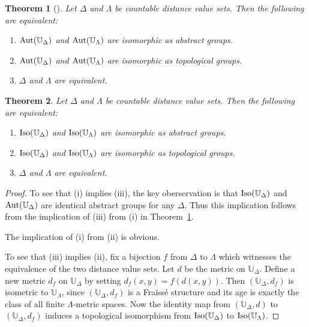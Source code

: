 \documentclass[10pt,a4paper]{amsart}
\newtheorem{theorem}{Theorem}[section]
\theoremstyle{definition}
\theoremstyle{remark}
\begin{document}
 \begin{theorem}[\cite{EGLMM}]\label{thm:char}
        Let $\Delta$ and $\Lambda$ be countable distance value sets. Then the following are equivalent: 
        \begin{enumerate}
            \item[\rm (i)] ${\rm Aut}(\mathbb{U}_\Delta)$ and ${\rm Aut}(\mathbb{U}_\Lambda)$ are isomorphic as abstract groups.  
            \item[\rm (ii)] ${\rm Aut}(\mathbb{U}_\Delta)$ and ${\rm Aut}(\mathbb{U}_\Lambda)$ are isomorphic as topological groups. 
            \item[\rm (iii)] $\Delta$ and $\Lambda$ are equivalent. 
        \end{enumerate}
    \end{theorem}

 \begin{theorem}\label{thm:remain2}
        Let $\Delta$ and $\Lambda$ be countable distance value sets. Then the following are equivalent: 
        \begin{enumerate}
            \item[\rm (i)] ${\rm Iso}(\mathbb{U}_\Delta)$ and ${\rm Iso}(\mathbb{U}_\Lambda)$ are isomorphic as abstract groups.  
            \item[\rm (ii)] ${\rm Iso}(\mathbb{U}_\Delta)$ and ${\rm Iso}(\mathbb{U}_\Lambda)$ are isomorphic as topological groups. 
            \item[\rm (iii)] $\Delta$ and $\Lambda$ are equivalent. 
        \end{enumerate}
    \end{theorem}

\begin{proof} To see that (i) implies (iii), the key oberservation is that $\mbox{\rm Iso}(\mathbb{U}_\Delta)$ and $\mbox{\rm Aut}(\mathbb{U}_\Delta)$ are identical abstract groups for any $\Delta$. Thus this implication follows from the implication of (iii) from (i) in Theorem~\ref{thm:char}. 

The implication of (i) from (ii) is obvious. 

To see that (iii) implies (ii), fix a bijection $f$ from $\Delta$ to $\Lambda$ which witnesses the equivalence of the two distance value sets. Let $d$ be the metric on $\mathbb{U}_\Delta$. Define a new metric $d_f$ on $\mathbb{U}_\Delta$ by setting $d_f(x,y)=f(d(x,y))$. Then $(\mathbb{U}_\Delta, d_f)$ is isometric to $\mathbb{U}_\Lambda$, since $(\mathbb{U}_\Delta, d_f)$ is a Fra\"iss\'e structure and its age is exactly the class of all finite $\Lambda$-metric spaces. Now the identity map from $(\mathbb{U}_\Delta,d)$ to $(\mathbb{U}_\Delta, d_f)$ induces a topological isomorphism from $\mbox{\rm Iso}(\mathbb{U}_\Delta)$ to $\mbox{\rm Iso}(\mathbb{U}_\Lambda)$. 
\end{proof}
\end{document}
